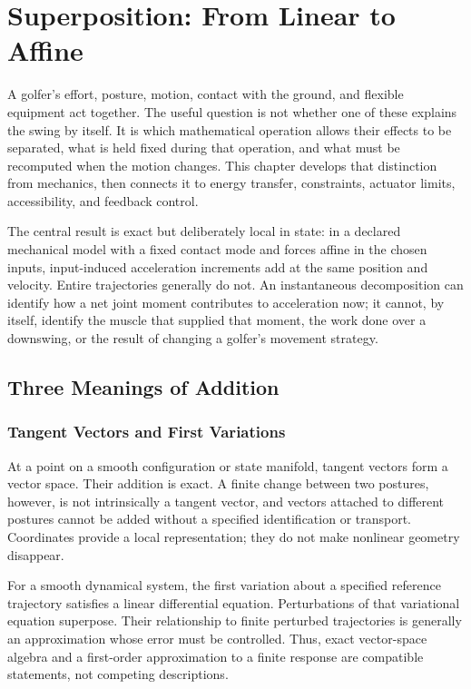 \chapter{Superposition: From Linear to Affine}
\label{ch:superposition}

A golfer's effort, posture, motion, contact with the ground, and flexible equipment act together. The useful question is not whether one of these explains the swing by itself. It is which mathematical operation allows their effects to be separated, what is held fixed during that operation, and what must be recomputed when the motion changes. This chapter develops that distinction from mechanics, then connects it to energy transfer, constraints, actuator limits, accessibility, and feedback control.

The central result is exact but deliberately local in state: in a declared mechanical model with a fixed contact mode and forces affine in the chosen inputs, input-induced acceleration increments add at the same position and velocity. Entire trajectories generally do not. An instantaneous decomposition can identify how a net joint moment contributes to acceleration now; it cannot, by itself, identify the muscle that supplied that moment, the work done over a downswing, or the result of changing a golfer's movement strategy.

\section{Three Meanings of Addition}

\subsection{Tangent Vectors and First Variations}

At a point on a smooth configuration or state manifold, tangent vectors form a vector space. Their addition is exact. A finite change between two postures, however, is not intrinsically a tangent vector, and vectors attached to different postures cannot be added without a specified identification or transport. Coordinates provide a local representation; they do not make nonlinear geometry disappear.

For a smooth dynamical system, the first variation about a specified reference trajectory satisfies a linear differential equation. Perturbations of that variational equation superpose. Their relationship to finite perturbed trajectories is generally an approximation whose error must be controlled. Thus, exact vector-space algebra and a first-order approximation to a finite response are compatible statements, not competing descriptions.

